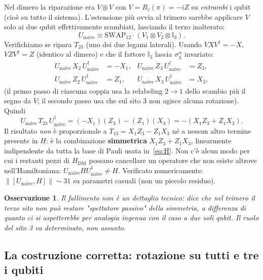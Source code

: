 \documentclass[11pt,a4paper]{article}
\newtheorem{osservazione}{Osservazione}
\begin{document}
Nel dimero la riparazione era $V\otimes V$ con $V=R_z(\pi)=-iZ$ su \emph{entrambi} i qubit
(cioè su tutto il sistema). L'estensione più ovvia al trimero sarebbe applicare $V$ solo ai due
qubit effettivamente scambiati, lasciando il terzo inalterato:
\begin{equation}
U_{\mathrm{naive}} \equiv \mathrm{SWAP}_{12}\cdot(V_1\otimes V_2\otimes\mathbb I_3).
\end{equation}
Verifichiamo se ripara $T_{23}$ (uno dei due legami laterali). Usando $VXV^\dagger=-X$,
$VZV^\dagger=Z$ (identico al dimero) e che il fattore $\mathbb I_3$ lascia $\sigma_3^\alpha$
invariato:
\begin{align}
U_{\mathrm{naive}}\,X_2\,U_{\mathrm{naive}}^\dagger &= -X_1, &
U_{\mathrm{naive}}\,Z_3\,U_{\mathrm{naive}}^\dagger &= Z_3,\\
U_{\mathrm{naive}}\,Z_2\,U_{\mathrm{naive}}^\dagger &= Z_1, &
U_{\mathrm{naive}}\,X_3\,U_{\mathrm{naive}}^\dagger &= X_3,
\end{align}
(il primo passo di ciascuna coppia usa la relabeling $2\to1$ dello scambio più il segno da $V$;
il secondo passo usa che sul sito 3 non agisce alcuna rotazione). Quindi
\begin{equation}
U_{\mathrm{naive}}\,T_{23}\,U_{\mathrm{naive}}^\dagger
= (-X_1)(Z_3) - (Z_1)(X_3) = -(X_1Z_3+Z_1X_3).
\label{eq:fail}
\end{equation}
Il risultato \emph{non} è proporzionale a $T_{13}=X_1Z_3-Z_1X_3$ né a nessun altro termine
presente in $H$: è la combinazione \textbf{simmetrica} $X_1Z_3+Z_1X_3$, linearmente indipendente
da tutta la base di Pauli usata in~\eqref{eq:H}. Non c'è alcun modo per cui i restanti pezzi di
$H_{\mathrm{DM}}$ possano cancellare un operatore che non esiste altrove nell'Hamiltoniana:
$U_{\mathrm{naive}}HU_{\mathrm{naive}}^\dagger\neq H$. Verificato numericamente:
$\|[U_{\mathrm{naive}},H]\|\sim31$ su parametri casuali (non un piccolo residuo).

\begin{osservazione}
Il fallimento non è un dettaglio tecnico: dice che nel trimero il terzo sito non può restare
"spettatore passivo" della simmetria, a differenza di quanto ci si aspetterebbe per analogia
ingenua con il caso a due soli qubit. Il ruolo del sito 3 va determinato, non assunto.
\end{osservazione}

\subsection{La costruzione corretta: rotazione su tutti e tre i qubiti}
\end{document}
